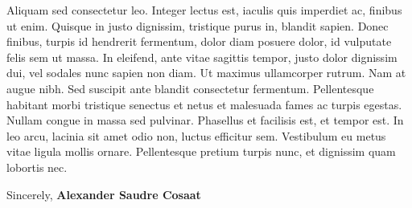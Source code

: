 \documentclass{article}
\begin{document}
\begin{tcolorbox}[
    title = \textcolor{headingLetter}{\faEnvelope \hfill \today},
    colback = letterFrameBackground,
    colframe = letterFrameColor
]
    Aliquam sed consectetur leo. Integer lectus est, iaculis quis imperdiet ac, finibus ut enim. Quisque in justo dignissim, tristique purus in, blandit sapien. Donec finibus, turpis id hendrerit fermentum, dolor diam posuere dolor, id vulputate felis sem ut massa. In eleifend, ante vitae sagittis tempor, justo dolor dignissim dui, vel sodales nunc sapien non diam. Ut maximus ullamcorper rutrum. Nam at augue nibh. Sed suscipit ante blandit consectetur fermentum. Pellentesque habitant morbi tristique senectus et netus et malesuada fames ac turpis egestas. Nullam congue in massa sed pulvinar. Phasellus et facilisis est, et tempor est. In leo arcu, lacinia sit amet odio non, luctus efficitur sem. Vestibulum eu metus vitae ligula mollis ornare. Pellentesque pretium turpis nunc, et dignissim quam lobortis nec.

    Sincerely,
    \textbf{Alexander Saudre Cosaat}
\end{tcolorbox}
\end{document}
